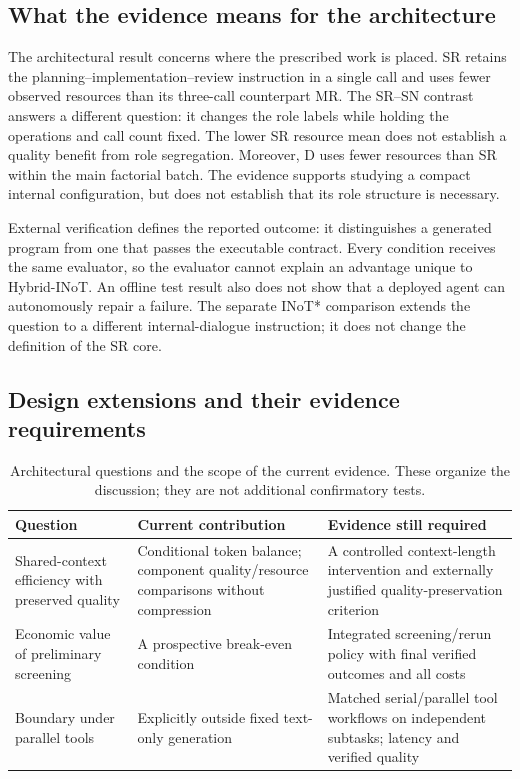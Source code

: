 \subsection{What the evidence means for the architecture}
The architectural result concerns where the prescribed work is placed. SR retains the planning--implementation--review instruction in a single call and uses fewer observed resources than its three-call counterpart MR. The SR--SN contrast answers a different question: it changes the role labels while holding the operations and call count fixed. The lower SR resource mean does not establish a quality benefit from role segregation. Moreover, D uses fewer resources than SR within the main factorial batch. The evidence supports studying a compact internal configuration, but does not establish that its role structure is necessary.

External verification defines the reported outcome: it distinguishes a generated program from one that passes the executable contract. Every condition receives the same evaluator, so the evaluator cannot explain an advantage unique to Hybrid-INoT. An offline test result also does not show that a deployed agent can autonomously repair a failure. The separate INoT* comparison extends the question to a different internal-dialogue instruction; it does not change the definition of the SR core.

\subsection{Design extensions and their evidence requirements}
\begin{table}[htbp]\centering\small
\caption{Architectural questions and the scope of the current evidence. These organize the discussion; they are not additional confirmatory tests.}
\label{tab:hybrid-scope}
\begin{tabularx}{\textwidth}{@{}>{\raggedright\arraybackslash}p{}>{\raggedright\arraybackslash}X>{\raggedright\arraybackslash}X@{}}\toprule
Question & Current contribution & Evidence still required\\\midrule
Shared-context efficiency with preserved quality & Conditional token balance; component quality/resource comparisons without compression & A controlled context-length intervention and externally justified quality-preservation criterion\\
Economic value of preliminary screening & A prospective break-even condition & Integrated screening/rerun policy with final verified outcomes and all costs\\
Boundary under parallel tools & Explicitly outside fixed text-only generation & Matched serial/parallel tool workflows on independent subtasks; latency and verified quality\\\bottomrule
\end{tabularx}\end{table}

